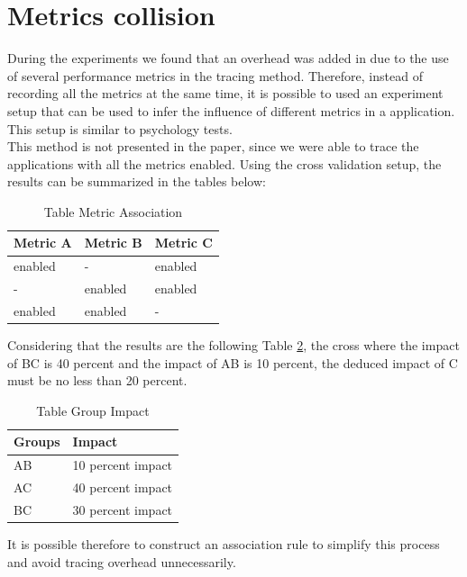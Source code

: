 \section{Metrics collision}
During the experiments we found that an overhead was added in due to the use of several performance metrics in the tracing method. Therefore, instead of recording all the metrics at the same time, it is possible to used an experiment setup that can be used to infer the influence of different metrics in a application. This setup is similar to psychology tests. \\
This method is not presented in the paper, since we were able to trace the applications with all the metrics enabled. Using the cross validation setup, the results can be summarized in the tables below:
\begin{table}[h]
\centering
\caption{Table Metric Association}
\label{tab:table1}
\begin{tabular}{lll}
\hline
Metric A              & Metric B   &     Metric C        \\ \hline
enabled & - & enabled \\ \hline
- & enabled & enabled \\ \hline
enabled & enabled & - 
\end{tabular}
\end{table}
 
Considering that the results are the following Table \ref{tab:table2}, the cross where the impact of BC is 40 percent and the impact of AB is 10 percent, the deduced impact of C must be no less than 20 percent.
    
\begin{table}[h]
\centering
\caption{Table Group Impact}
\label{tab:table2}
\begin{tabular}{ll}
\hline
Groups             &    Impact   \\ \hline
AB & 10 percent impact \\ \hline
AC & 40 percent impact \\ \hline
BC & 30 percent impact
\end{tabular}
\end{table}

It is possible therefore to construct an association rule to simplify this process and avoid tracing overhead unnecessarily.
